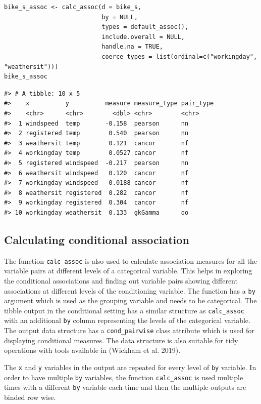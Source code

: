 \begin{verbatim}
bike_s_assoc <- calc_assoc(d = bike_s,
                           by = NULL,
                           types = default_assoc(),
                           include.overall = NULL,
                           handle.na = TRUE,
                           coerce_types = list(ordinal=c("workingday", "weathersit")))
bike_s_assoc
\end{verbatim}

\begin{verbatim}
#> # A tibble: 10 x 5
#>    x          y          measure measure_type pair_type
#>    <chr>      <chr>        <dbl> <chr>        <chr>    
#>  1 windspeed  temp       -0.158  pearson      nn       
#>  2 registered temp        0.540  pearson      nn       
#>  3 weathersit temp        0.121  cancor       nf       
#>  4 workingday temp        0.0527 cancor       nf       
#>  5 registered windspeed  -0.217  pearson      nn       
#>  6 weathersit windspeed   0.120  cancor       nf       
#>  7 workingday windspeed   0.0188 cancor       nf       
#>  8 weathersit registered  0.282  cancor       nf       
#>  9 workingday registered  0.304  cancor       nf       
#> 10 workingday weathersit  0.133  gkGamma      oo
\end{verbatim}

\hypertarget{calculating-conditional-association}{%
\subsection{Calculating conditional association}\label{calculating-conditional-association}}

The function \texttt{calc\_assoc} is also used to calculate association measures for all the variable pairs at different levels of a categorical variable. This helps in exploring the conditional associations and finding out variable pairs showing different associations at different levels of the conditioning variable. The function has a \texttt{by} argument which is used as the grouping variable and needs to be categorical. The tibble output in the conditional setting has a similar structure as \texttt{calc\_assoc} with an additional \texttt{by} column representing the levels of the categorical variable. The output data structure has a \texttt{cond\_pairwise} class attribute which is used for displaying conditional measures. The data structure is also suitable for tidy operations with tools available in  (Wickham et al. 2019).

The \texttt{x} and \texttt{y} variables in the output are repeated for every level of \texttt{by} variable. In order to have multiple \texttt{by} variables, the function \texttt{calc\_assoc} is used multiple times with a different \texttt{by} variable each time and then the multiple outputs are binded row wise.

